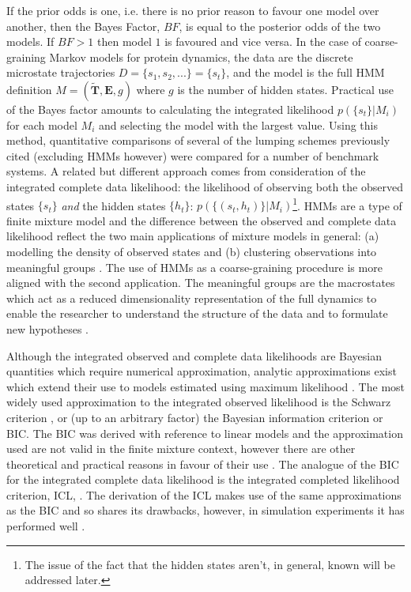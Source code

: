 If the prior odds is one, i.e. there is no prior reason to favour one model over another, then the Bayes Factor, $BF$, is equal to the posterior odds of the two models. If $BF > 1$ then model $1$ is favoured and vice versa. In the case of coarse-graining Markov models for protein dynamics, the data are the discrete microstate trajectories $D = \{s_1, s_2, ...\}= \{s_t\}$, and the model is the full HMM definition $M = (\tilde{\mathbf{T}}, \mathbf{E}, g)$ where $g$ is the number of hidden states. Practical use of the Bayes factor amounts to calculating the integrated likelihood $p(\{s_t\}|M_i)$ for each model $M_i$ and selecting the model with the largest value. Using this method, quantitative comparisons of several of the lumping schemes previously cited  (excluding HMMs however) were \cite{bowmanQuantitativeComparisonAlternative2013} compared for a number of benchmark systems.    
A related but different approach comes from consideration of the integrated complete data likelihood: the likelihood of observing both the observed states $\{s_t\}$ \emph{and} the hidden states $\{h_t\}$: $p(\{(s_t, h_t)\}|M_{i})$\footnote{The issue of the fact that the hidden states aren't, in general, known will be addressed later.}. HMMs are a type of finite mixture model \cite{mclachlanFiniteMixtureModels2000} and the difference between the observed and complete data likelihood reflect the two main applications of mixture models in general: (a) modelling the density of observed states  and (b) clustering observations into meaningful groups \cite{mclachlan1988mixture}. The use of HMMs as a coarse-graining procedure is more aligned with the second application. The meaningful groups are the macrostates which act as a reduced dimensionality representation of the full dynamics to enable the researcher to understand the structure of the data and to formulate new hypotheses \cite{bowmanQuantitativeComparisonAlternative2013}.

Although the integrated observed and complete data likelihoods are Bayesian quantities which require numerical approximation, analytic approximations exist which extend their use to models estimated using maximum likelihood \cite{kassBayesFactors1995}\cite{mclachlanFiniteMixtureModels2000}. The most widely used approximation to the integrated observed likelihood is the Schwarz criterion \cite{schwarzEstimatingDimensionModel1978a}, or (up to an arbitrary factor) the Bayesian information criterion or BIC. The BIC was derived with reference to linear models and the approximation used are not valid in the finite mixture context, however there are other theoretical and practical reasons in favour of their use \cite{fraley1998many}. The analogue of the BIC for the integrated complete data likelihood is the integrated completed likelihood criterion, ICL, \cite{biernackiAssessingMixtureModel2000a}. The derivation of the ICL makes use of the same approximations as the BIC and so shares its drawbacks, however, in simulation experiments it has performed well \cite{mclachlanFiniteMixtureModels2000}. 

